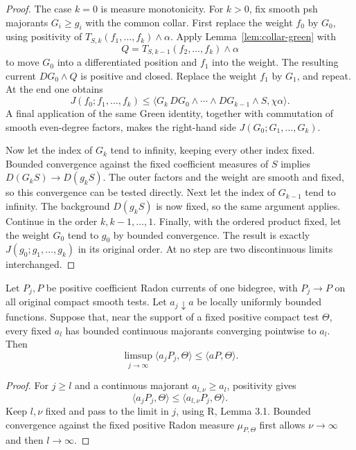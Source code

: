 \begin{proof}
The case $k=0$ is measure monotonicity. For $k>0$, fix smooth psh
majorants $G_i\geq g_i$ with the common collar. First replace the weight
$f_0$ by $G_0$, using positivity of
$T_{S,k}(f_1,\ldots,f_k)\wedge\alpha$. Apply
Lemma~\ref{lem:collar-green} with
\[
 Q=T_{S,k-1}(f_2,\ldots,f_k)\wedge\alpha
\]
to move $G_0$ into a differentiated position and $f_1$ into the weight.
The resulting current $DG_0\wedge Q$ is positive and closed. Replace
the weight $f_1$ by $G_1$, and repeat. At the end one obtains
\[
 J(f_0;f_1,\ldots,f_k)
 \leq\langle G_k\,DG_0\wedge\cdots\wedge DG_{k-1}\wedge S,
                     \chi\alpha\rangle.
\]
A final application of the same Green identity, together with
commutation of smooth even-degree factors, makes the right-hand side
$J(G_0;G_1,\ldots,G_k)$.

Now let the index of $G_k$ tend to infinity, keeping every other index
fixed. Bounded convergence against the fixed coefficient measures of
$S$ implies $D(G_kS)\to D(g_kS)$. The outer factors and the weight are
smooth and fixed, so this convergence can be tested directly. Next let
the index of $G_{k-1}$ tend to infinity. The background
$D(g_kS)$ is now fixed, so the same argument applies. Continue in the
order $k,k-1,\ldots,1$. Finally, with the ordered product fixed, let the
weight $G_0$ tend to $g_0$ by bounded convergence. The result is exactly
$J(g_0;g_1,\ldots,g_k)$ in its original order. At no step are two
discontinuous limits interchanged.
\end{proof}

\begin{lemma}
\label{lem:upper-weight}
Let $P_j,P$ be positive coefficient Radon currents of one bidegree,
with $P_j\to P$ on all original compact smooth tests. Let $a_j\downarrow a$
be locally uniformly bounded functions. Suppose that, near the support
of a fixed positive compact test $\Theta$, every fixed $a_l$ has bounded
continuous majorants converging pointwise to $a_l$.
Then
\[
 \limsup_{j\to\infty}\langle a_jP_j,\Theta\rangle
       \leq\langle aP,\Theta\rangle.
\]
\end{lemma}

\begin{proof}
For $j\geq l$ and a continuous majorant $a_{l,\nu}\geq a_l$,
positivity gives
\[
 \langle a_jP_j,\Theta\rangle
       \leq\langle a_{l,\nu}P_j,\Theta\rangle.
\]
Keep $l,\nu$ fixed and pass to the limit in $j$, using \textup{R},
Lemma 3.1. Bounded convergence against the fixed positive Radon measure
$\mu_{P,\Theta}$ first allows $\nu\to\infty$ and then $l\to\infty$.
\end{proof}

